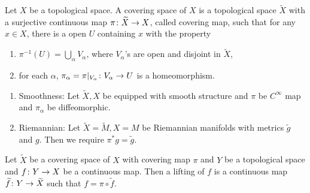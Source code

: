 \begin{enumerate}[label=\arabic{*}.]
	\begin{defn}
		Let $X$ be a topological space. A covering space of $X$ is a topological space $\widetilde{X}$ with a surjective continuous map $\pi \colon \widetilde{X} \rightarrow X$, called covering map, such that for any $x \in X$, there is a open $U$ containing $x$ with the property
		\begin{enumerate}[label=(\arabic{*})]
			\item $\pi^{-1}(U) = \bigcup_\alpha V_\alpha$, where $V_\alpha$'s are open and disjoint in $\widetilde{X}$,
			\item for each $\alpha$, $\pi_\alpha = \pi|_{V_\alpha} \colon V_\alpha \rightarrow U$ is a homeomorphism.
		\end{enumerate}
	\end{defn}
	\begin{rmk}
		\begin{enumerate}[label=(\roman{*})]
			\item Smoothness: Let $\widetilde{X}, X$ be equipped with smooth structure and $\pi$ be $C^\infty$ map and $\pi_\alpha$ be diffeomorphic.
			\item Riemannian: Let $\widetilde{X}=\widetilde{M}, X = M$ be Riemannian manifolds with metrics $\widetilde{g}$ and $g$. Then we require $\pi^*g = \widetilde{g}$. 
		\end{enumerate}
	\end{rmk}

	\begin{defn}[Lifting]
		Let $\widetilde{X}$ be a covering space of $X$ with covering map $\pi$ and $Y$ be a topological space and $f \colon Y \rightarrow X$ be a continuous map. Then a lifting of $f$ is a continuous map $\widetilde{f} \colon Y \rightarrow \widetilde{X}$ such that $f = \pi \circ \widetilde{f}$.
	\end{defn}


\end{enumerate}
